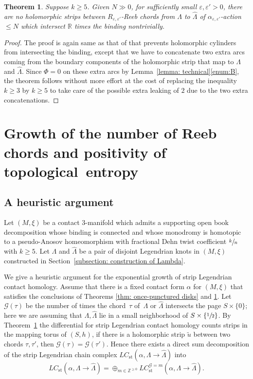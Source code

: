 \documentclass[JEP,XML,SOM,Unicode,NoFloatCountersInSection]{cedram}
\let\mathcal\mathscr
\let\ra\rightarrow
\newcommand{\st}{\mathrm{st}}
\theoremstyle{plain}
\newtheorem{thm}{Theorem}[section]
\theoremstyle{definition}
\numberwithin{equation}{subsection}
\newcommand{\RR}{\mathbb{R}}
\newcommand{\ZZ}{\mathbb{Z}}
\begin{document}
\begin{thm} \label{thm: strips}
Suppose $k\geq 5$. Given $N\gg 0$, for sufficiently small $\varepsilon,\varepsilon'>0$, there are no holomorphic strips between $R_{\varepsilon,\varepsilon'}$-Reeb chords from $\Lambda$ to $\widehat{\Lambda}$ of $\alpha_{\varepsilon,\varepsilon'}$-action $\leq N$ which intersect $\RR$ times the binding nontrivially.
\end{thm}

\begin{proof}
The proof is again same as that of \cite[Th.\,9.2]{CH2} that prevents holomorphic cylinders from intersecting the binding, except that we have to concatenate two extra arcs coming from the boundary components of the holomorphic strip that map to $\Lambda$ and $\widehat{\Lambda}$. Since $\Phi=0$ on these extra arcs by Lemma~\ref{lemma: technical}\eqref{enum:B}, the theorem follows without more effort at the cost of replacing the inequality $k\geq 3$ by $k\geq 5$ to take care of the possible extra leaking of $2$ due to the two extra concatenations.
\end{proof}

\section{Growth of the number of Reeb chords and positivity of topological~entropy}

\subsection{A heuristic argument} \label{subsection: growth}

Let $(M,\xi)$ be a contact $3$-manifold which admits a supporting open book decomposition whose binding is connected and whose monodromy is homotopic to a pseudo-Anosov homeomorphism with fractional Dehn twist coefficient $\sfrac{k}{n}$ with $k\geq 5$. Let $\Lambda$ and $\widehat{\Lambda}$ be a pair of disjoint Legendrian knots in $(M,\xi)$ constructed in Section~\ref{subsection: construction of Lambda}.

We give a heuristic argument for the exponential growth of strip Legendrian contact homology. Assume that there is a fixed contact form $\alpha$ for $(M,\xi)$ that satisfies the conclusions of Theorems \ref{thm: once-punctured disks} and \ref{thm: strips}. Let $\mathcal{G}(\tau)$ be the number of times the chord~$\tau$ of~$\Lambda$ or $\widehat\Lambda$ intersects the page $S\times\{0\}$; here we are assuming that $\Lambda,\widehat \Lambda$ lie in a small neighborhood of $S\times\{\sfrac{1}{2}\}$. By Theorem~\ref{thm: strips} the differential for strip Legendrian contact homology counts strips in the mapping torus of $(S,h)$, \ie if there is a holomorphic strip $\widetilde u$ between two chords $\tau,\tau'$, then $\mathcal{G}(\tau)=\mathcal{G}(\tau')$. Hence there exists a direct sum decomposition of the strip Legendrian chain complex $LC_{\st}(\alpha,\Lambda\ra\widehat\Lambda)$ into
$$LC_{\st}(\alpha,\Lambda\ra\widehat\Lambda)=\oplus_{m\in \ZZ^{\geq 0}} LC_{\st}^{\mathcal{G}=m} (\alpha,\Lambda\ra\widehat\Lambda).$$
\end{document}
